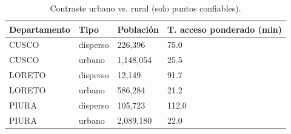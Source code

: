 \begin{table}
\caption{Contraste urbano vs. rural (solo puntos confiables).}
\label{tab:urbano_rural}
\begin{tabular}{llll}
\toprule
Departamento & Tipo & Población & T. acceso ponderado (min) \\
\midrule
CUSCO & disperso & 226,396 & 75.0 \\
CUSCO & urbano & 1,148,054 & 25.5 \\
LORETO & disperso & 12,149 & 91.7 \\
LORETO & urbano & 586,284 & 21.2 \\
PIURA & disperso & 105,723 & 112.0 \\
PIURA & urbano & 2,089,180 & 22.0 \\
\bottomrule
\end{tabular}
\end{table}
